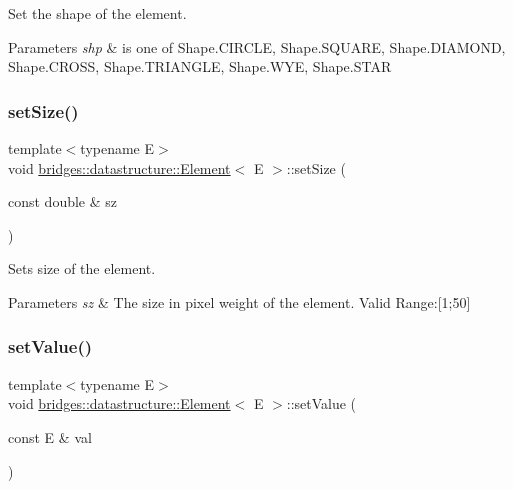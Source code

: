 Set the shape of the element. 


\begin{DoxyParams}{Parameters}
{\em shp} & is one of Shape.\+C\+I\+R\+C\+LE, Shape.\+S\+Q\+U\+A\+RE, Shape.\+D\+I\+A\+M\+O\+ND, Shape.\+C\+R\+O\+SS, Shape.\+T\+R\+I\+A\+N\+G\+LE, Shape.\+W\+YE, Shape.\+S\+T\+AR \\
\hline
\end{DoxyParams}
\mbox{\label{classbridges_1_1datastructure_1_1_element_a3200b0ac712c1720db62d1f0bbcb14be}} 
\subsubsection{\texorpdfstring{set\+Size()}{setSize()}}
{\footnotesize\ttfamily template$<$typename E$>$ \\
void \hyperlink{classbridges_1_1datastructure_1_1_element}{bridges\+::datastructure\+::\+Element}$<$ E $>$\+::set\+Size (\begin{DoxyParamCaption}\item[{const double \&}]{sz }\end{DoxyParamCaption})\hspace{0.3cm}{\ttfamily [inline]}}



Sets size of the element. 


\begin{DoxyParams}{Parameters}
{\em sz} & The size in pixel weight of the element. Valid Range\+:\mbox{[}1;50\mbox{]} \\
\hline
\end{DoxyParams}
\mbox{\label{classbridges_1_1datastructure_1_1_element_a26f2aceb9eed7195fd55b3538f3c059f}} 
\subsubsection{\texorpdfstring{set\+Value()}{setValue()}}
{\footnotesize\ttfamily template$<$typename E$>$ \\
void \hyperlink{classbridges_1_1datastructure_1_1_element}{bridges\+::datastructure\+::\+Element}$<$ E $>$\+::set\+Value (\begin{DoxyParamCaption}\item[{const E \&}]{val }\end{DoxyParamCaption})\hspace{0.3cm}{\ttfamily [inline]}}



